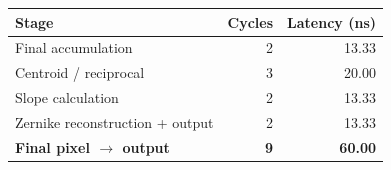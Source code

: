 \begin{tabular}{lrr}
\hline
Stage & Cycles & Latency (ns) \\
\hline
Final accumulation & 2 & 13.33 \\
Centroid / reciprocal & 3 & 20.00 \\
Slope calculation & 2 & 13.33 \\
Zernike reconstruction + output & 2 & 13.33 \\
\hline
\textbf{Final pixel $\rightarrow$ output} & \textbf{9} & \textbf{60.00} \\
\hline
\end{tabular}
